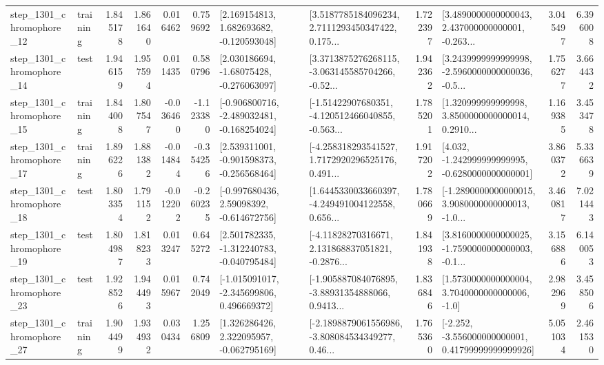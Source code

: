 \begin{tabular}{llrrrrllrlrr}
 step\_1301\_chromophore\_12 &  training &      1.845178 &    1.861640 &      0.016462 &  0.759692 &    [2.169154813, 1.682693682, -0.120593048] &  [3.5187785184096234, 2.7111293450347422, 0.175... &       1.722397 &  [3.4890000000000043, 2.437000000000001, -0.263... &            3.045497 &          6.396008 \\
 step\_1301\_chromophore\_14 &      test &      1.946159 &    1.957594 &      0.011435 &  0.580796 &    [2.030186694, -1.68075428, -0.276063097] &  [3.3713875276268115, -3.063145585704266, -0.52... &       1.942362 &  [3.2439999999999998, -2.5960000000000036, -0.5... &            1.756277 &          3.664432 \\
 step\_1301\_chromophore\_15 &  training &      1.844008 &    1.807547 &     -0.036460 & -1.123380 &  [-0.906800716, -2.489032481, -0.168254024] &  [-1.51422907680351, -4.120512466040855, -0.563... &       1.785201 &  [1.320999999999998, 3.8500000000000014, 0.2910... &            1.169385 &          3.453478 \\
 step\_1301\_chromophore\_17 &  training &      1.896226 &    1.881382 &     -0.014844 & -0.354256 &   [2.539311001, -0.901598373, -0.256568464] &  [-4.258318293541527, 1.7172920296525176, 0.491... &       1.917202 &   [4.032, -1.242999999999995, -0.6280000000000001] &            3.860372 &          5.336639 \\
 step\_1301\_chromophore\_18 &      test &      1.803354 &    1.791152 &     -0.012202 & -0.260235 &    [-0.997680436, 2.59098392, -0.614672756] &  [1.6445330033660397, -4.249491004122558, 0.656... &       1.780669 &  [-1.2890000000000015, 3.9080000000000013, -1.0... &            3.460817 &          7.021443 \\
 step\_1301\_chromophore\_19 &      test &      1.804987 &    1.818233 &      0.013247 &  0.645272 &   [2.501782335, -1.312240783, -0.040795484] &  [-4.11828270316671, 2.131868837051821, -0.2876... &       1.841938 &  [3.8160000000000025, -1.7590000000000003, -0.1... &            3.156886 &          6.140053 \\
 step\_1301\_chromophore\_23 &      test &      1.928526 &    1.944493 &      0.015967 &  0.742049 &   [-1.015091017, -2.345699806, 0.496669372] &  [-1.905887084076895, -3.88931354888066, 0.9413... &       1.836846 &     [1.5730000000000004, 3.7040000000000006, -1.0] &            2.982969 &          3.458506 \\
 step\_1301\_chromophore\_27 &  training &      1.904499 &    1.934932 &      0.030434 &  1.256809 &    [1.326286426, 2.322095957, -0.062795169] &  [-2.1898879061556986, -3.808084534349277, 0.46... &       1.765360 &  [-2.252, -3.556000000000001, 0.41799999999999926] &            5.051034 &          2.461530 \\

\end{tabular}

